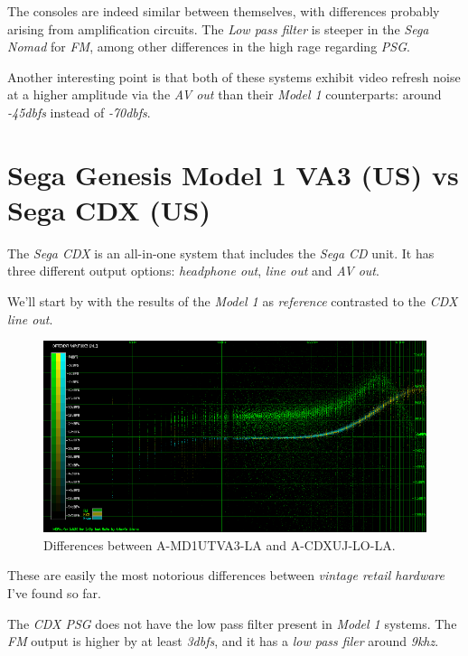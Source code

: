 \documentclass[10pt,a4paper]{report}
\newcommand{\khz}[1]{\textit{#1\acrshort{khz}}}
\newcommand{\db}[1]{\textit{#1\acrshort{dbfs}}}
\begin{document}
The consoles are indeed similar between themselves, with differences probably arising from amplification circuits. The \textit{Low pass filter} is steeper in the \textit{Sega Nomad} for \textit{FM}, among other differences in the high rage regarding \textit{PSG}.

Another interesting point is that both of these systems exhibit video refresh noise at a higher amplitude via the \textit{AV out} than their \textit{Model 1} counterparts: around \db{-45} instead of \db{-70}.

\section{Sega Genesis Model 1 VA3 (US) vs\\ Sega CDX (US)}

The \textit{Sega CDX} is an all-in-one system that includes the \textit{Sega CD} unit. It has three different output options: \textit{headphone out}, \textit{line out} and \textit{AV out}.

We'll start by with the results of the \textit{Model 1} as \textit{reference} contrasted to the \textit{CDX line out}.

\begin{figure}[H]
	\centering
	\includegraphics[width=1.0\linewidth]{images/results/8-A-MD1UTVA3-LA_vs_A-CDXUJ-LO-LA.png}
	\caption[A-MD1UTVA3-LA vs A-CDXUJ-LO-LA]{Differences between A-MD1UTVA3-LA and A-CDXUJ-LO-LA.}
	\label{fig:A-MD1UTVA3-LA_vs_A-CDXUJ-LO-LA}
\end{figure}

These are easily the most notorious differences between \textit{vintage retail hardware} I've found so far. 

The \textit{CDX PSG} does not have the low pass filter present in \textit{Model 1} systems. The \textit{FM} output is higher by at least \db{3}, and it has a \textit{low pass filer} around \khz{9}.
\end{document}
